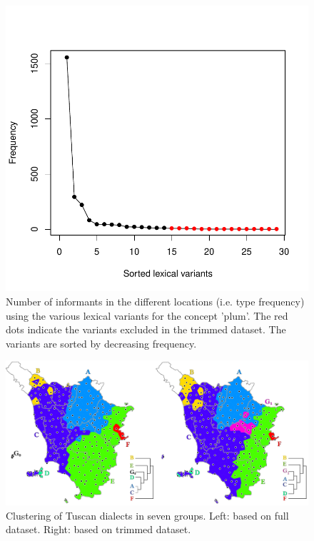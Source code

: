 \documentclass[output=paper]{LSP/langsci}
\begin{document}
\begin{figure}
\includegraphics[width=\textwidth]{illustrations/wiel_monte_fig1}
\caption{Number of informants in the different locations (i.e. type frequency) using the various lexical variants for the concept 'plum'. The red dots indicate the variants excluded in the trimmed dataset. The variants are sorted by decreasing frequency.}
\label{fig:1}
\end{figure}

\begin{figure}
\includegraphics[width=\textwidth]{illustrations/wiel_monte_fig2}
\caption{Clustering of Tuscan dialects in seven groups. Left: based on full dataset. Right: based on trimmed dataset.}
\label{fig:2}
\end{figure}
\end{document}
